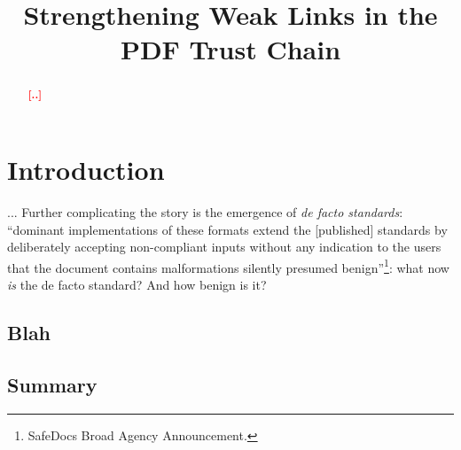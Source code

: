 \documentclass[conference,10pt]{IEEEtran}
\newcommand{\Todo}[1]{\textbf{\textcolor{red}{[#1]}}}
\begin{document}
\date{}

\title{Strengthening Weak Links in the PDF Trust Chain}

\author{
     \and
}

\maketitle

\begin{abstract}

\Todo{..}
  
\end{abstract}


\section{Introduction}


... Further complicating the story is the emergence of \emph{de facto standards}: ``dominant implementations of these formats extend the [published] standards by deliberately accepting non-compliant inputs without any indication to the users that the document contains malformations silently presumed benign''\footnote{SafeDocs Broad Agency Announcement.}: what now \emph{is} the de facto standard?  And how benign is it?

\subsection{Blah}

\subsection{Summary}
\end{document}

